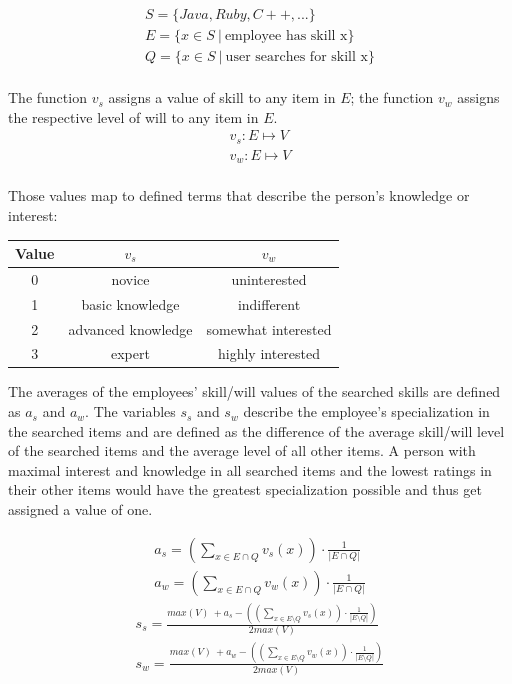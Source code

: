 \begin{gather*}
  S = \{Java, Ruby, C++, ...\} \\
  E = \{x \in S \ | \ \textrm{employee has skill x}\} \\
  Q = \{x \in S \ | \ \textrm{user searches for skill x}\} \\
\end{gather*}

\newpage

The function $v_s$ assigns a value of skill to any item in $E$; the function $v_w$ assigns the respective level of will to any item in $E$.
\begin{gather*}
  v_s: E \mapsto V \\
  v_w: E \mapsto V \\
\end{gather*}

Those values map to defined terms that describe the person's knowledge or interest:
\begin{center}
\begin{tabular}{c|c|c}
	Value & $v_s$ & $v_w$ \\
	\hline
	0 & novice & uninterested\\
	1 & basic knowledge & indifferent\\
	2 & advanced knowledge & somewhat interested\\
	3 & expert & highly interested\\
\end{tabular}
\end{center}

The averages of the employees' skill/will values of the searched skills are defined as $a_s$ and $a_w$.
The variables $s_s$ and $s_w$ describe the employee's specialization in the searched items and are defined as the difference
of the average skill/will level of the searched items and the average level of all other items.
A person with maximal interest and knowledge in all searched items and the lowest ratings in their other items would have the greatest specialization possible and thus get assigned a value of one.

\begin{gather*}
  a_s = \left( \sum_{x \in E \cap Q} v_s(x) \right) \cdot \frac{1}{|E \cap Q|} \\
  a_w = \left( \sum_{x \in E \cap Q} v_w(x) \right) \cdot \frac{1}{|E \cap Q|}
\end{gather*}
\begin{gather*}
  s_s = \frac{max(V) \ + a_s - \left( \left( \sum_{x \in E \setminus Q} v_s(x)\right) \cdot \frac{1}{|E \setminus Q|} \right)}{2 max(V)}\\
  s_w = \frac{max(V) \ + a_w - \left( \left( \sum_{x \in E \setminus Q} v_w(x)\right) \cdot \frac{1}{|E \setminus Q|} \right)}{2 max(V)}
\end{gather*}

